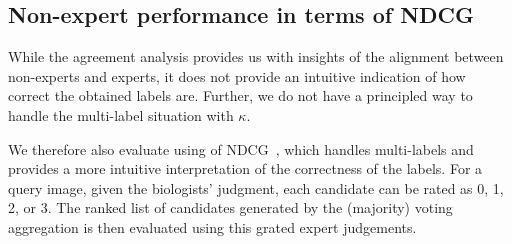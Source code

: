 \subsection{Non-expert performance in terms of NDCG}
\label{subsec:eval_ndcg}
While the agreement analysis provides us with insights of the alignment between non-experts and experts,
it does not provide an intuitive indication of how correct the obtained labels are. 
Further, we do not have a  principled way to handle the multi-label situation with $\kappa$.

We therefore also evaluate using of NDCG~\cite{Jarvelin02:ndcg}, which handles multi-labels
and provides a more intuitive interpretation of the correctness of the labels. 
For a query image, given the biologists' judgment, each candidate can be rated as 0, 1, 2, or 3. 
The ranked list of candidates generated by the (majority) voting aggregation is then evaluated using
this grated expert judgements.

%
%



